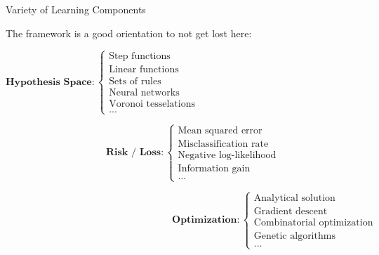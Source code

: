 \documentclass[11pt,compress,t,notes=noshow, xcolor=table]{beamer}
\begin{document}
\begin{frame}[squeeze]{Variety of Learning Components}
  
  
  The framework is a good orientation to not get lost here:
  
  
  \begin{footnotesize}
    
$\textbf{Hypothesis Space}: \begin{cases} 
    
    \text{Step functions} \\
    \text{Linear functions}\\
    \text{Sets of rules}\\
    \text{Neural networks}\\
    \text{Voronoi tesselations}\\
    \text{...}
  \end{cases}$
  
$\phantom{Hypothesis Space RISK } \textbf{Risk / Loss}: \begin{cases}
  \text{Mean squared error}\\
  \text{Misclassification rate}\\
  \text{Negative log-likelihood}\\
  \text{Information gain}\\
  \text{...}
\end{cases}$

$\phantom{hypothesis space risk RISK RISK RISK} \textbf{Optimization}: \begin{cases}
\text{Analytical solution}\\
\text{Gradient descent}\\
\text{Combinatorial optimization}\\
\text{Genetic algorithms}\\
\text{...}
\end{cases}$

\end{footnotesize}
\end{frame}


\end{document}
